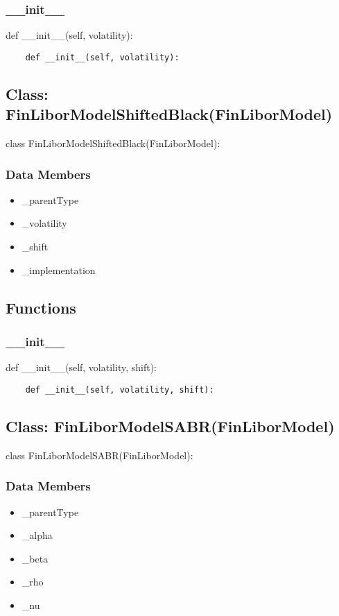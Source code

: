 \documentclass[twoside,11pt]{book}
\begin{document}
\subsubsection*{{\bf \_\_init\_\_}}
def \_\_init\_\_(self, volatility): 

\begin{lstlisting}
    def __init__(self, volatility):
\end{lstlisting}

\subsection*{Class: FinLiborModelShiftedBlack(FinLiborModel)}
class FinLiborModelShiftedBlack(FinLiborModel): 

\subsubsection*{Data Members}
\begin{itemize}
\item{\_parentType}
\item{\_volatility}
\item{\_shift}
\item{\_implementation}
\end{itemize}

\subsection*{Functions}

\subsubsection*{{\bf \_\_init\_\_}}
def \_\_init\_\_(self, volatility, shift): 

\begin{lstlisting}
    def __init__(self, volatility, shift):
\end{lstlisting}

\subsection*{Class: FinLiborModelSABR(FinLiborModel)}
class FinLiborModelSABR(FinLiborModel): 

\subsubsection*{Data Members}
\begin{itemize}
\item{\_parentType}
\item{\_alpha}
\item{\_beta}
\item{\_rho}
\item{\_nu}
\end{itemize}
\end{document}

